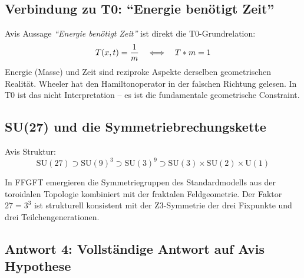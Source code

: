 \subsection{Verbindung zu T0: ``Energie benötigt Zeit''}

Avis Aussage \textit{``Energie benötigt Zeit''} ist direkt die T0-Grundrelation:
\begin{equation}
  T(x,t) = \frac{1}{m} \quad \Longleftrightarrow \quad T * m = 1
\end{equation}
Energie (Masse) und Zeit sind reziproke Aspekte derselben geometrischen Realität. Wheeler hat den Hamiltonoperator in der falschen Richtung gelesen. In T0 ist das nicht Interpretation -- es ist die fundamentale geometrische Constraint.

\subsection{SU(27) und die Symmetriebrechungskette}

Avis Struktur:
\begin{equation}
  \mathrm{SU}(27) \supset \mathrm{SU}(9)^3 \supset \mathrm{SU}(3)^9 \supset \mathrm{SU}(3) \times \mathrm{SU}(2) \times \mathrm{U}(1)
\end{equation}

In FFGFT emergieren die Symmetriegruppen des Standardmodells aus der toroidalen Topologie kombiniert mit der fraktalen Feldgeometrie. Der Faktor $27 = 3^3$ ist strukturell konsistent mit der Z3-Symmetrie der drei Fixpunkte und drei Teilchengenerationen.

\subsection{Antwort 4: Vollständige Antwort auf Avis Hypothese}

